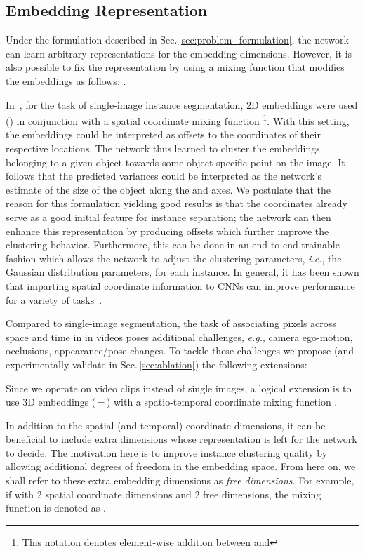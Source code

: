 \documentclass[runningheads]{llncs}
\makeatletter
\newcommand*{\eg}{\emph{e.g.}\@\xspace}
\newcommand*{\ie}{\emph{i.e.}\@\xspace}
\newcommand{\refsec}[1]{Sec.\,\ref{sec:#1}}
\newcommand{\PAR}[1]{\vskip4pt \noindent {\bf #1~}}
\makeatother
\begin{document}
\subsection{Embedding Representation}
\label{sec:embedding_representation}

Under the formulation described in \refsec{problem_formulation}, the network can learn arbitrary representations for the embedding dimensions. However, it is also possible to fix the representation by using a mixing function  that modifies the embeddings  as follows: .

In~\cite{Neven19CVPR}, for the task of single-image instance segmentation, 2D embeddings were used () in conjunction with a spatial coordinate mixing function 
\footnote{This notation denotes element-wise addition between  and }.
With this setting, the embeddings could be interpreted as offsets to the  coordinates of their respective locations. The network thus learned to cluster the embeddings belonging to a given object towards some object-specific point on the image. It follows that the predicted variances could be interpreted as the network's estimate of the size of the object along the  and  axes. We postulate that the reason for this formulation yielding good results is that the  coordinates already serve as a good initial feature for instance separation; the network can then enhance this representation by producing offsets which further improve the clustering behavior. Furthermore, this can be done in an end-to-end trainable fashion which allows the network to adjust the clustering parameters, \ie, the Gaussian distribution parameters, for each instance. In general, it has been shown that imparting spatial coordinate information to CNNs can improve performance for a variety of tasks~\cite{Liu2018NIPS,Novotny18ECCV}.

Compared to single-image segmentation, the task of associating pixels across space and time in in videos poses additional challenges, \eg, camera ego-motion, occlusions, appearance/pose changes. To tackle these challenges we propose (and experimentally validate in \refsec{ablation}) the following extensions:

\PAR{Spatio-temporal coordinating mixing:} Since we operate on video clips instead of single images, a logical extension is to use 3D embeddings (\,=\,) with a spatio-temporal coordinate mixing function .

\PAR{Free dimensions:} In addition to the spatial (and temporal) coordinate dimensions, it can be beneficial to include extra dimensions whose representation is left for the network to decide. The motivation here is to improve instance clustering quality by allowing additional degrees of freedom in the embedding space. From here on, we shall refer to these extra embedding dimensions as \textit{free dimensions}. For example, if  with 2 spatial coordinate dimensions and 2 free dimensions, the mixing function is denoted as . 
\end{document}
